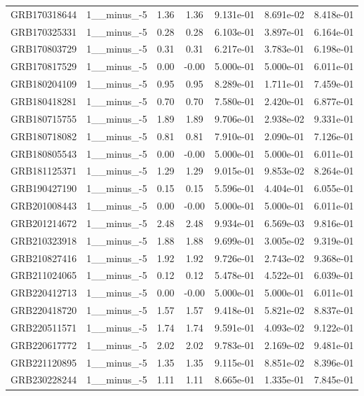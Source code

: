 \documentclass[12pt]{article}
\begin{document}
\begin{table}[h!]
{\begin{tabular}{l c c c c c c}
GRB170318644 & 1__minus_-5 & 1.36 & 1.36 & 9.131e-01 & 8.691e-02 & 8.418e-01 \\
GRB170325331 & 1__minus_-5 & 0.28 & 0.28 & 6.103e-01 & 3.897e-01 & 6.164e-01 \\
GRB170803729 & 1__minus_-5 & 0.31 & 0.31 & 6.217e-01 & 3.783e-01 & 6.198e-01 \\
GRB170817529 & 1__minus_-5 & 0.00 & -0.00 & 5.000e-01 & 5.000e-01 & 6.011e-01 \\
GRB180204109 & 1__minus_-5 & 0.95 & 0.95 & 8.289e-01 & 1.711e-01 & 7.459e-01 \\
GRB180418281 & 1__minus_-5 & 0.70 & 0.70 & 7.580e-01 & 2.420e-01 & 6.877e-01 \\
GRB180715755 & 1__minus_-5 & 1.89 & 1.89 & 9.706e-01 & 2.938e-02 & 9.331e-01 \\
GRB180718082 & 1__minus_-5 & 0.81 & 0.81 & 7.910e-01 & 2.090e-01 & 7.126e-01 \\
GRB180805543 & 1__minus_-5 & 0.00 & -0.00 & 5.000e-01 & 5.000e-01 & 6.011e-01 \\
GRB181125371 & 1__minus_-5 & 1.29 & 1.29 & 9.015e-01 & 9.853e-02 & 8.264e-01 \\
GRB190427190 & 1__minus_-5 & 0.15 & 0.15 & 5.596e-01 & 4.404e-01 & 6.055e-01 \\
GRB201008443 & 1__minus_-5 & 0.00 & -0.00 & 5.000e-01 & 5.000e-01 & 6.011e-01 \\
GRB201214672 & 1__minus_-5 & 2.48 & 2.48 & 9.934e-01 & 6.569e-03 & 9.816e-01 \\
GRB210323918 & 1__minus_-5 & 1.88 & 1.88 & 9.699e-01 & 3.005e-02 & 9.319e-01 \\
GRB210827416 & 1__minus_-5 & 1.92 & 1.92 & 9.726e-01 & 2.743e-02 & 9.368e-01 \\
GRB211024065 & 1__minus_-5 & 0.12 & 0.12 & 5.478e-01 & 4.522e-01 & 6.039e-01 \\
GRB220412713 & 1__minus_-5 & 0.00 & -0.00 & 5.000e-01 & 5.000e-01 & 6.011e-01 \\
GRB220418720 & 1__minus_-5 & 1.57 & 1.57 & 9.418e-01 & 5.821e-02 & 8.837e-01 \\
GRB220511571 & 1__minus_-5 & 1.74 & 1.74 & 9.591e-01 & 4.093e-02 & 9.122e-01 \\
GRB220617772 & 1__minus_-5 & 2.02 & 2.02 & 9.783e-01 & 2.169e-02 & 9.481e-01 \\
GRB221120895 & 1__minus_-5 & 1.35 & 1.35 & 9.115e-01 & 8.851e-02 & 8.396e-01 \\
GRB230228244 & 1__minus_-5 & 1.11 & 1.11 & 8.665e-01 & 1.335e-01 & 7.845e-01 \\

\end{tabular}}
\end{table}
\end{document}
